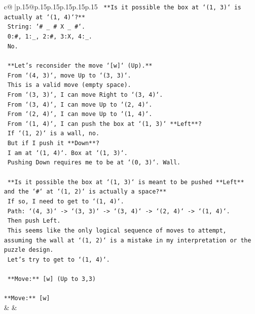 \documentclass{article}
\begin{document}
{\begin{supertabular}{c@{$\;$}|p{.15\linewidth}@{}p{.15\linewidth}p{.15\linewidth}p{.15\linewidth}p{.15\linewidth}p{.15\linewidth}}
{{{\texttt{    **Is it possible the box at `(1, 3)` is actually at `(1, 4)`?**} \\
\texttt{    String: `\# \_ \# X \_ \#`.} \\
\texttt{    0:\#, 1:\_, 2:\#, 3:X, 4:\_.} \\
\texttt{    No.} \\
\\ 
\texttt{    **Let's reconsider the move `{[}w{]}` (Up).**} \\
\texttt{    From `(4, 3)`, move Up to `(3, 3)`.} \\
\texttt{    This is a valid move (empty space).} \\
\texttt{    From `(3, 3)`, I can move Right to `(3, 4)`.} \\
\texttt{    From `(3, 4)`, I can move Up to `(2, 4)`.} \\
\texttt{    From `(2, 4)`, I can move Up to `(1, 4)`.} \\
\texttt{    From `(1, 4)`, I can push the box at `(1, 3)` **Left**?} \\
\texttt{    If `(1, 2)` is a wall, no.} \\
\texttt{    But if I push it **Down**?} \\
\texttt{    I am at `(1, 4)`. Box at `(1, 3)`.} \\
\texttt{    Pushing Down requires me to be at `(0, 3)`. Wall.} \\
\\ 
\texttt{    **Is it possible the box at `(1, 3)` is meant to be pushed **Left** and the `\#` at `(1, 2)` is actually a space?**} \\
\texttt{    If so, I need to get to `(1, 4)`.} \\
\texttt{    Path: `(4, 3)` {-}> `(3, 3)` {-}> `(3, 4)` {-}> `(2, 4)` {-}> `(1, 4)`.} \\
\texttt{    Then push Left.} \\
\texttt{    This seems like the only logical sequence of moves to attempt, assuming the wall at `(1, 2)` is a mistake in my interpretation or the puzzle design.} \\
\texttt{    Let's try to get to `(1, 4)`.} \\
\\ 
\texttt{    **Move:** {[}w{]} (Up to 3,3)} \\
\\ 
\texttt{**Move:** {[}w{]}} \\
            }
        }
    }
    & & \\ \\


\end{supertabular}}
\end{document}
